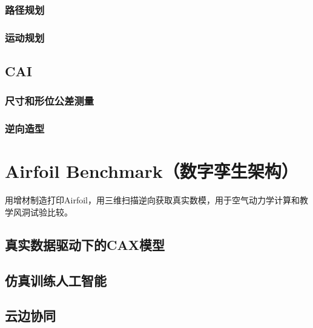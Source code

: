 \documentclass[letterpaper,10pt,english]{sphinxmanual}
\begin{document}
\subsubsection{路径规划}
\label{\detokenize{src/fengsim/cam:id1}}

\subsubsection{运动规划}
\label{\detokenize{src/fengsim/cam:id2}}
\sphinxstepscope


\subsection{CAI}
\label{\detokenize{src/fengsim/cai:cai}}\label{\detokenize{src/fengsim/cai::doc}}

\subsubsection{尺寸和形位公差测量}
\label{\detokenize{src/fengsim/cai:id1}}

\subsubsection{逆向造型}
\label{\detokenize{src/fengsim/cai:id2}}
\sphinxstepscope


\section{Airfoil Benchmark（数字孪生架构）}
\label{\detokenize{src/fengsim/airfoil:airfoil-benchmark}}\label{\detokenize{src/fengsim/airfoil::doc}}
\sphinxAtStartPar
用增材制造打印Airfoil，用三维扫描逆向获取真实数模，用于空气动力学计算和教学风洞试验比较。

\sphinxstepscope


\subsection{真实数据驱动下的CAX模型}
\label{\detokenize{src/fengsim/dt:cax}}\label{\detokenize{src/fengsim/dt::doc}}

\subsection{仿真训练人工智能}
\label{\detokenize{src/fengsim/dt:id1}}

\subsection{云边协同}
\label{\detokenize{src/fengsim/dt:id2}}
\end{document}
